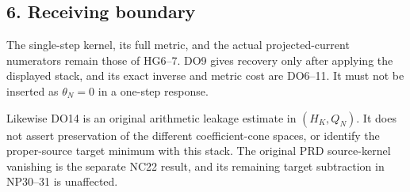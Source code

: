 \documentclass[11pt]{article}
\begin{document}
\subsection{6. Receiving boundary}\label{receiving-boundary}

The single-step kernel, its full metric, and the actual projected-current numerators remain those of HG6--7. DO9 gives recovery only after applying the displayed stack, and its exact inverse and metric cost are DO6--11. It must not be inserted as \(\theta_N=0\) in a one-step response.

Likewise DO14 is an original arithmetic leakage estimate in \((H_K,Q_N)\). It does not assert preservation of the different coefficient-cone spaces, or identify the proper-source target minimum with this stack. The original PRD source-kernel vanishing is the separate NC22 result, and its remaining target subtraction in NP30--31 is unaffected.
\end{document}

